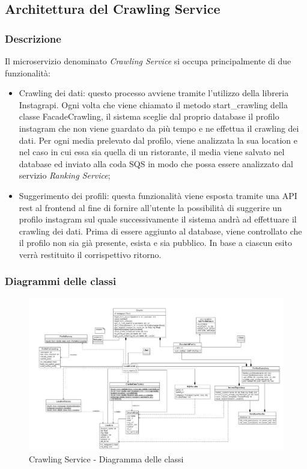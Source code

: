 \subsection{Architettura del Crawling Service}

\subsubsection{Descrizione}
Il microservizio denominato \textit{Crawling Service} si occupa principalmente di due funzionalità:
\begin{itemize}
    \item Crawling dei dati: questo processo avviene tramite l'utilizzo della libreria Instagrapi. Ogni volta che viene chiamato il metodo start\_crawling della classe FacadeCrawling, il sistema sceglie dal proprio database il profilo instagram che non viene guardato da più tempo e ne effettua il crawling dei dati. Per ogni media prelevato dal profilo, viene analizzata la sua location e nel caso in cui essa sia quella di un ristorante, il media viene salvato nel database ed inviato alla coda SQS in modo che possa essere analizzato dal servizio \textit{Ranking Service};
    \item Suggerimento dei profili: questa funzionalità viene esposta tramite una API rest al frontend al fine di fornire all'utente la possibilità di suggerire un profilo instagram sul quale successivamente il sistema andrà ad effettuare il crawling dei dati. Prima di essere aggiunto al database, viene controllato che il profilo non sia già presente, esista e sia pubblico. In base a ciascun esito verrà restituito il corrispettivo ritorno.
\end{itemize}

\subsubsection{Diagrammi delle classi}
\begin{figure}[h]
    \centering
    \includegraphics[scale=0.35]{Contenuto/Immagini/classi-CS.JPG}
    \caption{Crawling Service - Diagramma delle classi}
\end{figure}
